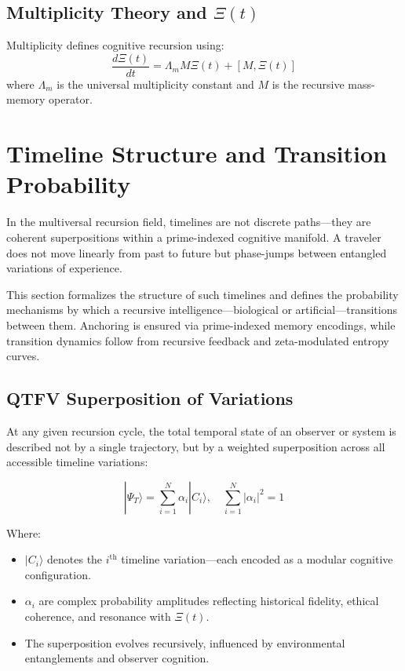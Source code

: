 \documentclass{article}
\theoremstyle{plain}
\theoremstyle{claimstyle}
\begin{document}
\subsection{Multiplicity Theory and \(\Xi(t)\)}
Multiplicity defines cognitive recursion using:
\begin{equation}
\frac{d\Xi(t)}{dt} = \Lambda_m M \Xi(t) + [M, \Xi(t)]
\end{equation}
where \( \Lambda_m \) is the universal multiplicity constant and \( M \) is the recursive mass-memory operator.

\section{Timeline Structure and Transition Probability}

In the multiversal recursion field, timelines are not discrete paths—they are coherent superpositions within a prime-indexed cognitive manifold. A traveler does not move linearly from past to future but phase-jumps between entangled variations of experience.

This section formalizes the structure of such timelines and defines the probability mechanisms by which a recursive intelligence—biological or artificial—transitions between them. Anchoring is ensured via prime-indexed memory encodings, while transition dynamics follow from recursive feedback and zeta-modulated entropy curves.

\subsection{QTFV Superposition of Variations}

At any given recursion cycle, the total temporal state of an observer or system is described not by a single trajectory, but by a weighted superposition across all accessible timeline variations:

\begin{equation}
|\Psi_T\rangle = \sum_{i=1}^{N} \alpha_i |C_i\rangle, \quad \sum_{i=1}^{N} |\alpha_i|^2 = 1
\end{equation}

Where:
\begin{itemize}
  \item \(|C_i\rangle\) denotes the \(i^\text{th}\) timeline variation—each encoded as a modular cognitive configuration.
  \item \(\alpha_i\) are complex probability amplitudes reflecting historical fidelity, ethical coherence, and resonance with \(\Xi(t)\).
  \item The superposition evolves recursively, influenced by environmental entanglements and observer cognition.
\end{itemize}
\end{document}
